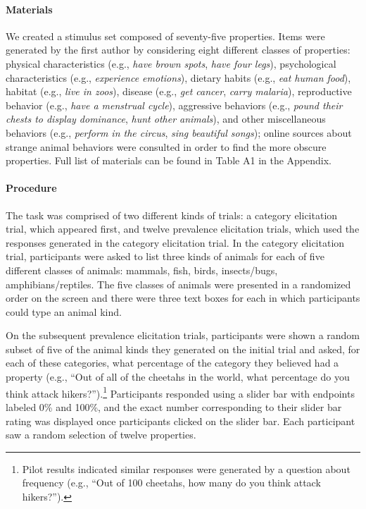 \documentclass[floatsintext,man]{apa6}
\let\oldparagraph\paragraph
\renewcommand{\paragraph}[1]{\oldparagraph{#1}\mbox{}}
\let\rmarkdownfootnote\footnote%
\def\footnote{\protect\rmarkdownfootnote}
\begin{document}
\hypertarget{materials}{%
\paragraph{Materials}\label{materials}}
We created a stimulus set composed of seventy-five properties.
Items were generated by the first author by considering eight different classes of properties: physical characteristics (e.g., \emph{have brown spots}, \emph{have four legs}), psychological characteristics (e.g., \emph{experience emotions}), dietary habits (e.g., \emph{eat human food}), habitat (e.g., \emph{live in zoos}), disease (e.g., \emph{get cancer}, \emph{carry malaria}), reproductive behavior (e.g., \emph{have a menstrual cycle}), aggressive behaviors (e.g., \emph{pound their chests to display dominance}, \emph{hunt other animals}), and other miscellaneous behaviors (e.g., \emph{perform in the circus}, \emph{sing beautiful songs}); online sources about strange animal behaviors were consulted in order to find the more obscure properties. Full list of materials can be found in Table A1 in the Appendix.

\hypertarget{procedure-and-materials-1}{%
\paragraph{Procedure}\label{procedure-and-materials-1}}
The task was comprised of two different kinds of trials: a category elicitation trial, which appeared first, and twelve prevalence elicitation trials, which used the responses generated in the category elicitation trial.
In the category elicitation trial, participants were asked to list three kinds of animals for each of five different classes of animals: mammals, fish, birds, insects/bugs, amphibians/reptiles.
The five classes of animals were presented in a randomized order on the screen and there were three text boxes for each in which participants could type an animal kind.

On the subsequent prevalence elicitation trials, participants were shown a random subset of five of the animal kinds they generated on the initial trial and asked, for each of these categories, what percentage of the category they believed had a property (e.g., \enquote{Out of all of the cheetahs in the world, what percentage do you think attack hikers?}).\footnote{Pilot results indicated similar responses were generated by a question about frequency (e.g., \enquote{Out of 100 cheetahs, how many do you think attack hikers?}).} 
Participants responded using a slider bar with endpoints labeled 0\% and 100\%, and the exact number corresponding to their slider bar rating was displayed once participants clicked on the slider bar.
Each participant saw a random selection of twelve properties.
\end{document}

